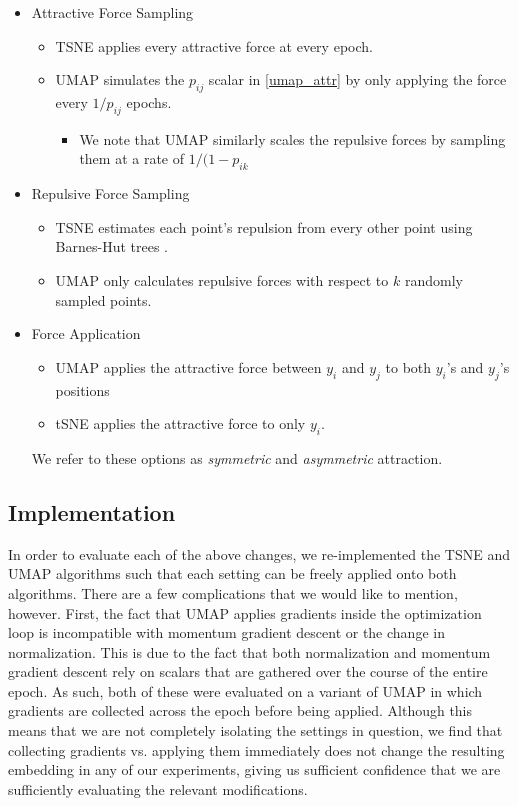 \documentclass[sigconf, nonacm]{acmart}
\begin{document}
\begin{itemize}
    \item Attractive Force Sampling
        \begin{itemize}
        \item TSNE applies every attractive force at every epoch.
        \item UMAP simulates the $p_{ij}$ scalar in \ref{umap_attr} by only applying the force every $1 / p_{ij}$ epochs.
            \begin{itemize}
                \item We note that UMAP similarly scales the repulsive forces by sampling them at a rate of $1 / (1 - p_{ik}$
            \end{itemize}
        \end{itemize}

    \item Repulsive Force Sampling
        \begin{itemize}
            \item TSNE estimates each point's repulsion from every other point using Barnes-Hut trees \cite{barnes1986hierarchical}.
        \item UMAP only calculates repulsive forces with respect to $k$ randomly sampled points.
        \end{itemize}

    \item Force Application
        \begin{itemize}
        \item UMAP applies the attractive force between $y_i$ and $y_j$ to both $y_i$'s and $y_j$'s positions
        \item tSNE applies the attractive force to only $y_i$.
        \end{itemize}
        We refer to these options as \textit{symmetric} and \textit{asymmetric} attraction.

\end{itemize}

\subsection{Implementation}
In order to evaluate each of the above changes, we re-implemented the TSNE and UMAP algorithms such that each setting can be freely applied onto both algorithms.
There are a few complications that we would like to mention, however. First, the fact that UMAP applies gradients inside the optimization loop is incompatible
with momentum gradient descent or the change in normalization. This is due to the fact that both normalization and momentum gradient
descent rely on scalars that are gathered over the course of the entire epoch. As such, both of these were evaluated on a variant of UMAP in which gradients are
collected across the epoch before being applied. Although this means that we are not completely isolating the settings in question, we find that collecting
gradients vs. applying them immediately does not change the resulting embedding in any of our experiments, giving us sufficient confidence that we are
sufficiently evaluating the relevant modifications.
\end{document}
